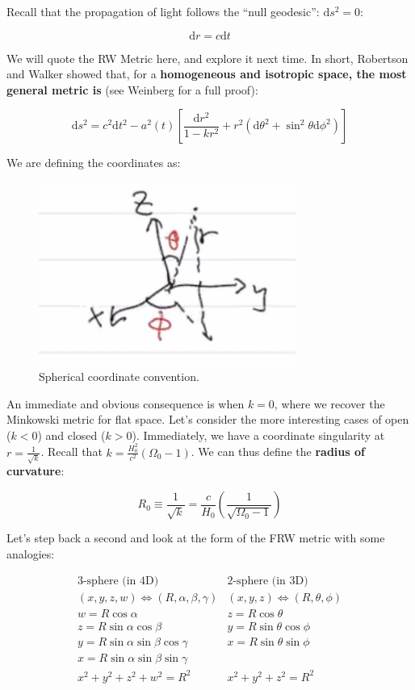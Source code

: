 \documentclass{article}
\newcommand{\be}{\begin{equation}}
\newcommand{\ee}{\end{equation}}
\def\iff{\Leftrightarrow}
\def\iff{\Leftrightarrow}
\begin{document}
Recall that the propagation of light follows the ``null geodesic'': $\mathrm{d}s^2 = 0$:

\be
\mathrm{d}r = c\mathrm{d}t
\ee

We will quote the RW Metric here, and explore it next time. In short, Robertson and Walker showed that, for a \textbf{homogeneous and isotropic space, the most general metric is} (see Weinberg for a full proof):

\be
\mathrm{d}s^2 = c^2 \mathrm{d}t^2 - a^2\left(t\right) \left[\frac{\mathrm{d}r^2}{1-kr^2} + r^2 \left(\mathrm{d}\theta^2 + \sin^2\theta \mathrm{d}\phi^2\right) \right]
\ee

We are defining the coordinates as:

\begin{figure}
    \centering
    \includegraphics[width=0.75\textwidth]{coordinates.png}
    \caption{Spherical coordinate convention. }
    \label{fig:coords}
\end{figure}

An immediate and obvious consequence is when $k=0$, where we recover the Minkowski metric for flat space. 
Let's consider the more interesting cases of open ($k<0$) and closed ($k>0$). Immediately, we have a coordinate singularity at $r = \frac{1}{\sqrt{k}}$. Recall that $k = \frac{H_0^2}{c^2} \left(\Omega_0-1\right)$. We can thus define the \textbf{radius of curvature}:

\be
R_0 \equiv \frac{1}{\sqrt{k}} = \frac{c}{H_0} \left(\frac{1}{\sqrt{\Omega_0-1}}\right)
\ee

Let's step back a second and look at the form of the FRW metric with some analogies:

$$\begin{matrix} 
\text{3-sphere (in 4D)} & \text{2-sphere (in 3D)}\\
(x,y,z,w)\iff (R,\alpha,\beta,\gamma)&(x,y,z)\iff(R,\theta,\phi)\\
w=R\cos\alpha&z=R\cos\theta\\
z=R\sin\alpha\cos\beta&y=R\sin\theta\cos\phi\\
y=R\sin\alpha\sin\beta\cos\gamma&x=R\sin\theta\sin\phi\\
x=R\sin\alpha\sin\beta\sin\gamma& \\
x^2+y^2+z^2+w^2=R^2&x^2+y^2+z^2=R^2\\
\end{matrix}$$
\end{document}
